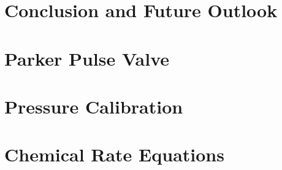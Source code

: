 \documentclass [PhD,nolistoftables,scheader] {uclathes}
\begin{document}
%	
%		
%	
%		
%		
%		
%		
%		
%			
%	
%			
%			
%	

\chapter{Conclusion and Future Outlook}


\appendix

\chapter{Parker Pulse Valve}


\chapter{Pressure Calibration} \label{sec: calibration}


\chapter{Chemical Rate Equations}


%




\end{document}
